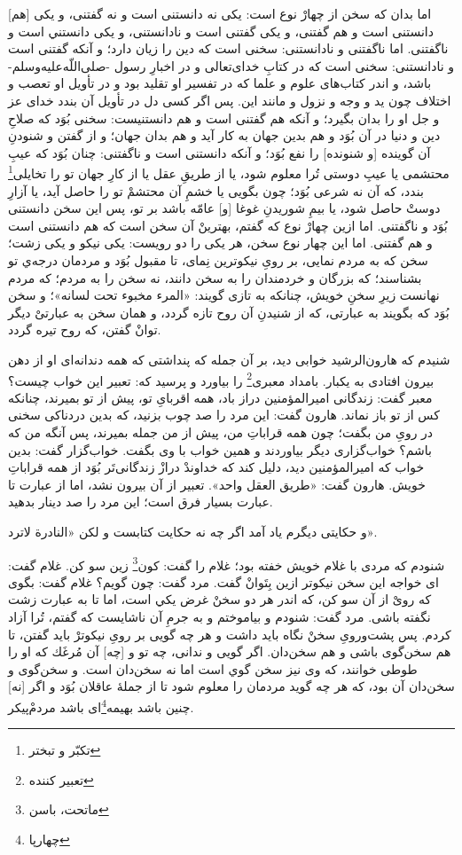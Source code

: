  
 اما بدان كه سخن از چهارْ نوع است: يكى نه دانستنى است و نه گفتنى، و يكى [هم] دانستنى است و هم گفتنى، و يكى گفتنى است و نادانستنى، و يكى دانستني‌ است و ناگفتنى. اما ناگفتنى و نادانستنى: سخنى است كه دين را زيان دارد؛ و آنكه گفتنى است و نادانستنى: سخنى است كه در كتابِ خداى‌تعالى و در اخبارِ رسول -صلى‌اللّه‌عليه‌و‌‌سلم- باشد، و اندر كتاب‌هاى علوم و علما كه در تفسير او تقليد بود و در تأويل او تعصب و اختلاف چون يد و وجه و نزول و مانند اين. پس اگر كسى دل در تأويل آن بندد خداى عز و جل او را بدان بگيرد؛ و آنكه هم گفتنى است و هم دانستنيست: سخنى بُوَد كه صلاحِ دين و دنيا در آن بُوَد و هم بدين جهان به كار آيد و هم بدان جهان؛ و از گفتن و شنودنِ آن گوينده [و شنونده] را نفع بُوَد؛ و آنكه دانستنى است و ناگفتنى: چنان بُوَد كه عيبِ محتشمى يا عيبِ دوستى تُرا معلوم شود، يا از طريقِ عقل يا از كارِ جهان تو را تخايلى\footnote{تکبّر و تبختر} بندد، كه آن نه شرعى بُوَد؛ چون بگويى يا خشمِ آن محتشمْ تو را حاصل آيد، يا آزارِ دوستْ حاصل شود، يا بيمِ شوريدنِ غوغا [و] عامّه باشد بر تو، پس اين سخن دانستنى بُوَد و ناگفتنى. اما ازين چهارْ نوع كه گفتم، بهترينْ آن سخن است كه هم دانستنى است و هم گفتنى. اما اين چهار نوع سخن، هر يكى را دو رويست: يكى نيكو و يكى زشت؛ سخن كه به مردم نمايى، بر روىِ نيكوترين نِماى، تا مقبول بُوَد و مردمان درجه‌ي تو بشناسند؛ كه بزرگان و خردمندان را به سخن  دانند، نه سخن را به مردم؛ كه مردم نهانست زيرِ سخنِ خويش، چنانكه به تازى گويند: «المرء مخبوء تحت لسانه»؛ و سخن بُوَد كه بگويند به عبارتى، كه از شنيدنِ آن روح تازه گردد، و همان سخن به عبارتىْ ديگر توان‌ْ گفتن، كه روح تيره گردد.




 شنيدم كه هارون‌الرشيد خوابى ديد، بر آن جمله كه پنداشتى كه همه دندانه‌اى او از دهن بيرون افتادى به يكبار. بامداد معبرى\footnote{تعبیر کننده} را بياورد و پرسيد كه: تعبير اين خواب چيست‌؟ معبر گفت: زندگانى امير‌المؤمنين دراز باد، همه اقرباىِ تو، پيش از تو بميرند، چنانكه كس از تو باز نماند. هارون گفت: اين مرد را صد چوب بزنيد، كه بدين دردناكى سخنى در روىِ من بگفت؛ چون همه قراباتِ من، پيش از من جمله بميرند، پس آنگه من كه باشم‌؟ خواب‌گزارى ديگر بياوردند و همين خواب با وى بگفت. خواب‌گزار گفت: بدين خواب كه امير‌المؤمنين ديد، دليل كند كه خداوندْ درازْ زندگانى‌تَر بُوَد از همه قراباتِ خويش. هارون گفت: «طريق العقل واحد». تعبير از آن بيرون نشد، اما از عبارت تا عبارت بسيار فرق است؛ اين مرد را صد دينار بدهيد.
 
 و حكايتى ديگرم ياد آمد اگر چه نه حكايت كتابست و لكن «النادرة لاترد». 

 شنودم كه مردى با غلام خويش خفته بود؛ غلام را گفت: كون\footnote{ماتحت، باسن} زين سو كن. غلام گفت: اى خواجه اين سخن نيكوتر ازين بِتَوانْ گفت. مرد گفت:
چون گويم‌؟ غلام گفت: بگوى كه روىْ از آن سو كن، كه اندر هر دو سخنْ غرض يكي است، اما تا به عبارت زشت نگفته باشى. مرد گفت: شنودم و بياموختم و به جرمِ آن ناشايست كه گفتم، تُرا آزاد كردم. پس پشت‌و‌روىِ سخنْ نگاه بايد داشت و هر چه گويى بر روىِ نيكوترْ بايد گفتن، تا هم سخن‌گوى باشى و هم سخن‌دان. اگر گويى و ندانى، چه تو و [چه] آن مُرغَك كه او را طوطى خوانند، كه وى نيز سخن گوي‌ است اما نه سخن‌دان است. و سخن‌گوى و سخن‌دان آن بود، كه هر چه گويد مردمان را معلوم شود تا از جملۀ عاقلان بُوَد و اگر [نه] چنين باشد بهيمه‌\footnote{چهارپا}اى باشد مردمْ‌پيكر.

